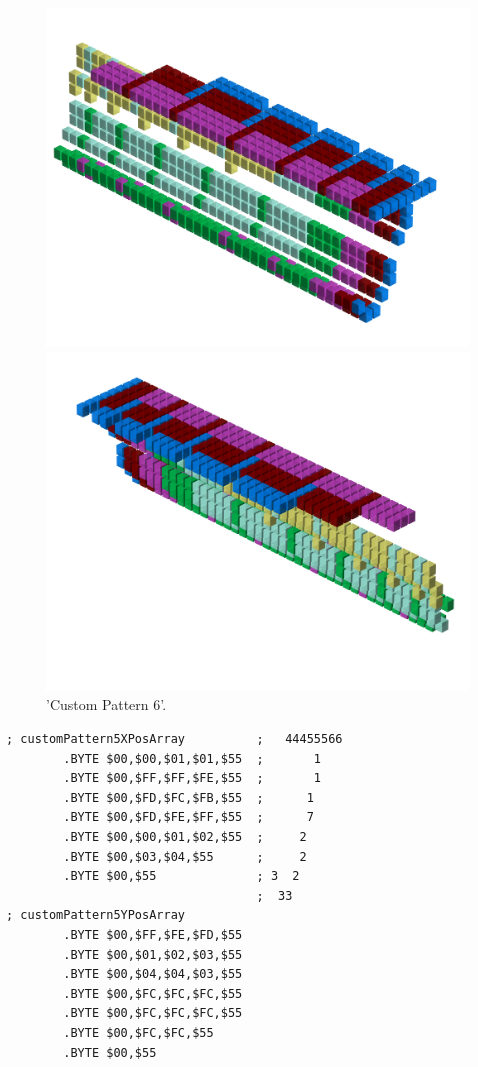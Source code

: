 \begin{figure}[H]
    \centering
    \begin{adjustbox}{width=12cm,center}
      \includegraphics[width=12cm]{src/patterns/pattern13-45.png}%
    \end{adjustbox}
    \begin{adjustbox}{width=12cm,margin=0cm -4cm}
      \includegraphics[width=12cm]{src/patterns/pattern13-225.png}%
    \end{adjustbox}
\caption{'Custom Pattern 6'.}
\end{figure}
\clearpage

\begin{lstlisting}
; customPattern5XPosArray          ;   44455566
        .BYTE $00,$00,$01,$01,$55  ;       1   
        .BYTE $00,$FF,$FF,$FE,$55  ;       1   
        .BYTE $00,$FD,$FC,$FB,$55  ;      1    
        .BYTE $00,$FD,$FE,$FF,$55  ;      7    
        .BYTE $00,$00,$01,$02,$55  ;     2     
        .BYTE $00,$03,$04,$55      ;     2     
        .BYTE $00,$55              ; 3  2      
                                   ;  33       
; customPattern5YPosArray
        .BYTE $00,$FF,$FE,$FD,$55
        .BYTE $00,$01,$02,$03,$55
        .BYTE $00,$04,$04,$03,$55
        .BYTE $00,$FC,$FC,$FC,$55
        .BYTE $00,$FC,$FC,$FC,$55
        .BYTE $00,$FC,$FC,$55
        .BYTE $00,$55
\end{lstlisting}


